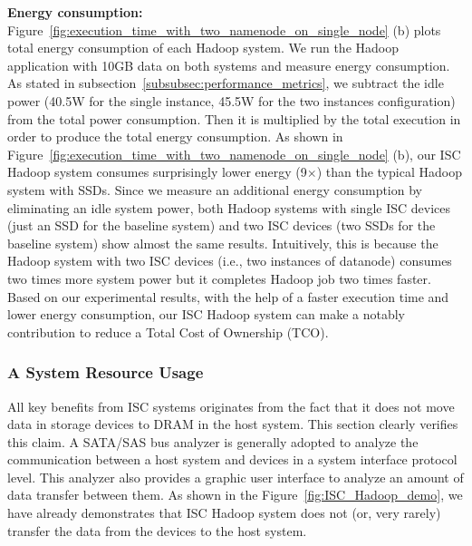 \textbf{Energy consumption:} Figure~\ref{fig:execution_time_with_two_namenode_on_single_node} (b) plots total energy consumption of each Hadoop system. We run the Hadoop application with 10GB data on both systems and measure energy consumption. As stated in subsection~\ref{subsubsec:performance_metrics}, we subtract the idle power (40.5W for the single instance, 45.5W for the two instances configuration) from the total power consumption. Then it is multiplied by the total execution in order to produce the total energy consumption. As shown in Figure~\ref{fig:execution_time_with_two_namenode_on_single_node} (b), our ISC Hadoop system consumes surprisingly lower energy (9$\times$) than the typical Hadoop system with SSDs. Since we measure an additional energy consumption by eliminating an idle system power, both Hadoop systems with single ISC devices (just an SSD for the baseline system) and two ISC devices (two SSDs for the baseline system) show almost the same results. Intuitively, this is because the Hadoop system with two ISC devices (i.e., two instances of datanode) consumes two times more system power but it completes Hadoop job two times faster.
Based on our experimental results, with the help of a faster execution time and lower energy consumption, our ISC Hadoop system can make a notably contribution to reduce a Total Cost of Ownership (TCO). 





\subsubsection{A System Resource Usage}\label{subsubsec:Exp_result_resource_usage}
All key benefits from ISC systems originates from the fact that it does not move data in storage devices to DRAM in the host system. This section clearly verifies this claim. A SATA/SAS bus analyzer is generally adopted to analyze the communication between a host system and devices in a system interface protocol level. This analyzer also provides a graphic user interface to analyze an amount of data transfer between them. As shown in the Figure~\ref{fig:ISC_Hadoop_demo}, we have already demonstrates that ISC Hadoop system does not (or, very rarely) transfer the data from the devices to the host system. 

